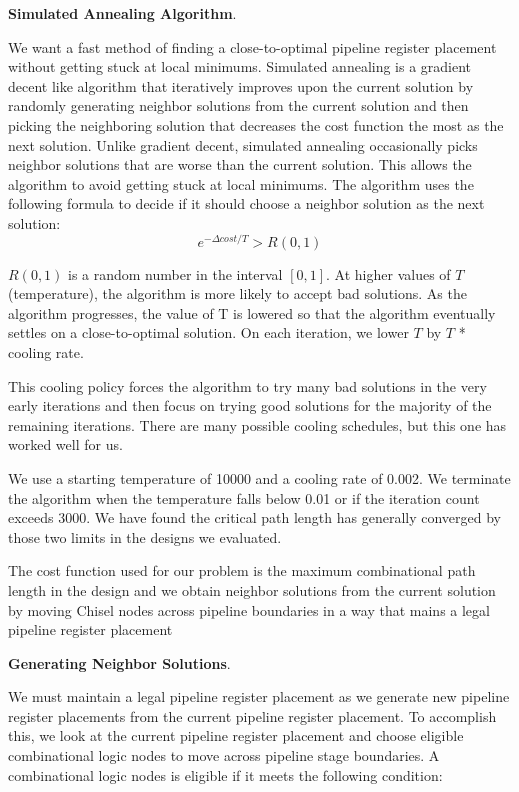 {\bf Simulated Annealing Algorithm}.

We want a fast method of finding a close-to-optimal pipeline register placement without getting stuck at local minimums. Simulated annealing is a gradient decent like algorithm that iteratively improves upon the current solution by randomly generating neighbor solutions from the current solution and then picking the neighboring solution that decreases the cost function the most as the next solution. Unlike gradient decent, simulated annealing occasionally picks neighbor solutions that are worse than the current solution. This allows the algorithm to avoid getting stuck at local minimums. The algorithm uses the following formula to decide if it should choose a neighbor solution as the next solution:
$$
e^{-\Delta cost/T} > R(0,1)
$$


$R(0,1)$ is a random number in the interval $[0, 1]$. At higher values of $T$ (temperature), the algorithm is more likely to accept bad solutions. As the algorithm progresses, the value of T is lowered so that the algorithm eventually settles on a close-to-optimal solution. On each iteration, we lower $T$ by $T$ * cooling rate.


This cooling policy forces the algorithm to try many bad solutions in the very early iterations and then focus on trying good solutions for the majority of the remaining iterations. There are many possible cooling schedules, but this one has worked well for us.

We use a starting temperature of 10000 and a cooling rate of 0.002. We terminate the algorithm when the temperature falls below 0.01 or if the iteration count exceeds 3000. We have found the critical path length has generally converged by those two limits in the designs we evaluated.

The cost function used for our problem is the maximum combinational path length in the design and we obtain neighbor solutions from the current solution by moving Chisel nodes across pipeline boundaries in a way that mains a legal pipeline register placement


{\bf Generating Neighbor Solutions}.

We must maintain a legal pipeline register placement as we generate new pipeline register placements from the current pipeline register placement. To accomplish this, we look at the current pipeline register placement and choose eligible combinational logic nodes to move across pipeline stage boundaries. A combinational logic nodes is eligible if it meets the following condition:

